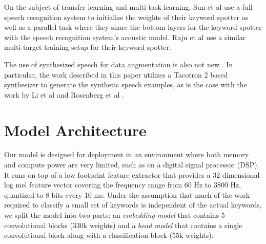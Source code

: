 \documentclass{article}
\begin{document}
On the subject of transfer learning and multi-task learning, Sun et al \cite{Sun2017CompressedTD} use a full speech recognition system to initialize the weights of their keyword spotter as well as a parallel task where they share the bottom layers for the keyword spotter with the speech recognition system's acoustic model. Raju et al \cite{raju2018data} use a similar multi-target training setup for their keyword spotter.







The use of synthesized speech for data augmentation is also not new \cite{rygaard2015using, li2018training, rosenberg2019speech, Mimura2018LeveragingSS}. In particular, the work described in this paper utilizes a Tacotron 2 \cite{Shen_2018} based synthesizer to generate the synthetic speech examples, as is the case with the work by Li et al \cite{li2018training} and Rosenberg et al \cite{rosenberg2019speech}.





















\section{Model Architecture}
\label{sec:model_architecture}
Our model is designed for deployment 
in an environment where both memory and compute power are very limited, such as on a digital signal processor (DSP). It runs on top of a low footprint feature extractor that provides a 32 dimensional log mel feature vector covering the frequency range from 60 Hz to 3800 Hz, quantized to 8 bits every 10 ms. Under the assumption that much of the work required to classify a small set of keywords is independent of the actual keywords, we split the model into two parts: an \textit{embedding model} that contains 5 convolutional blocks (330k weights) and a \textit{head model} that contains a single convolutional block along with a classification block (55k weights).
\end{document}
